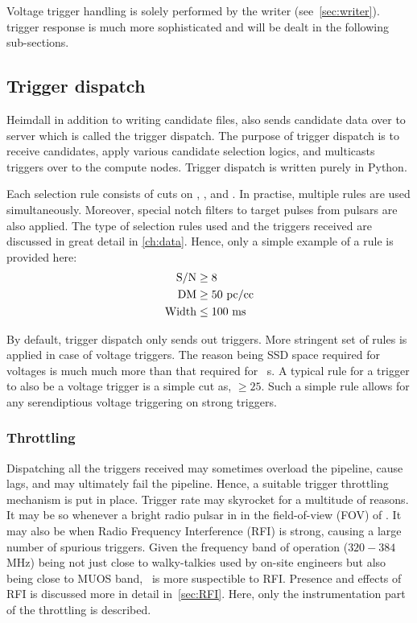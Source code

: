 \par Voltage trigger handling is solely performed by the writer (see~\autoref{sec:writer}). \dbson trigger response is much more sophisticated and will be dealt in the following sub-sections.

\subsection {Trigger dispatch}

\par Heimdall in addition to writing candidate files, also sends candidate data over to server which is called the trigger dispatch. 
The purpose of trigger dispatch is to receive candidates, apply various candidate selection logics, and multicasts triggers over to the compute nodes. 
Trigger dispatch is written purely in Python.

\par Each selection rule consists of cuts on \sn, \dm, and \wd. In practise, multiple rules are used simultaneously. Moreover, special notch filters to target pulses from pulsars are also applied. 
The type of selection rules used and the triggers received are discussed in great detail in \autoref{ch:data}. Hence, only a simple example of a rule is provided here:
\begin{align*}
	{\rm S/N} &\geq 8 \\
	{\rm DM} &\geq 50 {\rm\ pc/cc} \\
	{\rm Width} &\leq 100 {\rm\ ms}
\end{align*}

\par By default, trigger dispatch only sends out \dbson triggers. More stringent set of rules is applied in case of voltage triggers. 
The reason being SSD space required for voltages is much much more than that required for \dbson~s. 
A typical rule for a \dbson trigger to also be a voltage trigger is a simple cut as, \sn $\geq 25$. Such a simple rule allows for any serendiptious voltage triggering on strong triggers.

\subsubsection {Throttling}
\label{sssub:rfim}
\par Dispatching all the triggers received may sometimes overload the pipeline, cause lags, and may ultimately fail the pipeline.
Hence, a suitable trigger throttling mechanism is put in place.
Trigger rate may skyrocket for a multitude of reasons. It may be so whenever a bright radio pulsar in in the field-of-view (FOV) of \vf.
It may also be when Radio Frequency Interference (RFI) is strong, causing a large number of spurious triggers.
Given the frequency band of operation ($320-384$ MHz) being not just close to walky-talkies used by on-site engineers but also being close to MUOS band, \vf~is more suspectible to RFI.
Presence and effects of RFI is discussed more in detail in~\autoref{sec:RFI}. 
Here, only the instrumentation part of the throttling is described.

